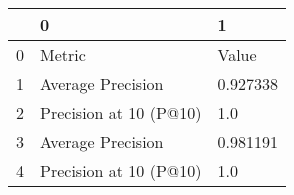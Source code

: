 \begin{tabular}{lll}
\toprule
{} &                       0 &         1 \\
\midrule
0 &                  Metric &     Value \\
1 &       Average Precision &  0.927338 \\
2 &  Precision at 10 (P@10) &       1.0 \\
3 &       Average Precision &  0.981191 \\
4 &  Precision at 10 (P@10) &       1.0 \\
\bottomrule
\end{tabular}
